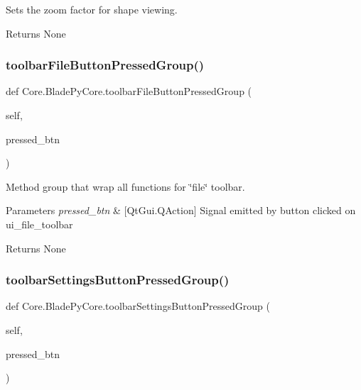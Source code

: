 Sets the zoom factor for shape viewing. 

\begin{DoxyReturn}{Returns}
None 
\end{DoxyReturn}
\hypertarget{class_core_1_1_blade_py_core_ab5cf733dc40f2b17761056148fd51263}{}\label{class_core_1_1_blade_py_core_ab5cf733dc40f2b17761056148fd51263} 
\subsubsection{\texorpdfstring{toolbar\+File\+Button\+Pressed\+Group()}{toolbarFileButtonPressedGroup()}}
{\footnotesize\ttfamily def Core.\+Blade\+Py\+Core.\+toolbar\+File\+Button\+Pressed\+Group (\begin{DoxyParamCaption}\item[{}]{self,  }\item[{}]{pressed\+\_\+btn }\end{DoxyParamCaption})}



Method group that wrap all functions for \char`\"{}file\char`\"{} toolbar. 


\begin{DoxyParams}{Parameters}
{\em pressed\+\_\+btn} & \mbox{[}Qt\+Gui.\+Q\+Action\mbox{]} Signal emitted by button clicked on ui\+\_\+file\+\_\+toolbar \\
\hline
\end{DoxyParams}
\begin{DoxyReturn}{Returns}
None 
\end{DoxyReturn}
\hypertarget{class_core_1_1_blade_py_core_abe6ec5c591c19b280f2e24bb198a1d6b}{}\label{class_core_1_1_blade_py_core_abe6ec5c591c19b280f2e24bb198a1d6b} 
\subsubsection{\texorpdfstring{toolbar\+Settings\+Button\+Pressed\+Group()}{toolbarSettingsButtonPressedGroup()}}
{\footnotesize\ttfamily def Core.\+Blade\+Py\+Core.\+toolbar\+Settings\+Button\+Pressed\+Group (\begin{DoxyParamCaption}\item[{}]{self,  }\item[{}]{pressed\+\_\+btn }\end{DoxyParamCaption})}



